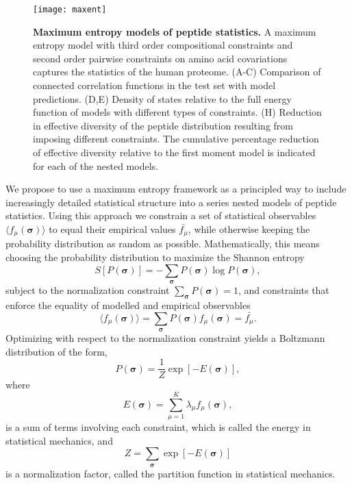 \documentclass[superscriptaddress,twocolumn,pre]{revtex4}
\newcommand{\B}{\boldsymbol}
\newcommand{\<}{\langle}
\renewcommand{\>}{\rangle}
\begin{document}
\begin{figure*}
    \texttt{[image: maxent]}
        \caption{{\bf Maximum entropy models of peptide statistics.} A maximum entropy model with third order compositional constraints and second order pairwise constraints on amino acid covariations captures the statistics of the human proteome. (A-C) Comparison of connected correlation functions in the test set with model predictions. (D,E) Density of states relative to the full energy function of models with different types of constraints. (H) Reduction in effective diversity of the peptide distribution resulting from imposing different constraints. The cumulative percentage reduction of effective diversity relative to the first moment model is indicated for each of the nested models.
    \label{figmaxent}
    }
\end{figure*}

We propose to use a maximum entropy framework as a principled way to include increasingly detailed statistical structure into a series nested models of peptide statistics. Using this approach we constrain a set of statistical observables $\langle f_\mu(\boldsymbol \sigma)\rangle$ to equal their empirical values $\bar{f_\mu}$, while otherwise keeping the probability distribution as random as possible. Mathematically, this means choosing the probability distribution to maximize the Shannon entropy
\begin{equation}
    S[P(\B \sigma)] = - \sum_{\B \sigma} P(\B \sigma) \log P(\B \sigma),
\end{equation}
subject to the normalization constraint $\sum_{\B \sigma} P(\B \sigma) = 1$, and constraints that enforce the equality of modelled and empirical observables
\begin{equation}
    \langle f_\mu(\boldsymbol \sigma)\rangle = \sum_{\boldsymbol \sigma} P(\boldsymbol \sigma) f_\mu(\boldsymbol \sigma) = \bar{f_\mu}.
\end{equation}
Optimizing with respect to the normalization constraint yields a Boltzmann distribution of the form,
\begin{equation}
    P(\boldsymbol \sigma) = \frac{1}{Z} \exp\left[ -E(\B \sigma) \right],
\end{equation}
where
\begin{equation}
 E(\B \sigma) = \sum_{\mu=1}^K \lambda_\mu f_\mu(\boldsymbol \sigma),
\end{equation}
is a sum of terms involving each constraint, which is called the energy in statistical mechanics, and 
\begin{equation}
    Z = \sum_{\B \sigma} \exp \left[ - E(\B \sigma) \right]
\end{equation}
is a normalization factor, called the partition function in statistical mechanics.
\end{document}
